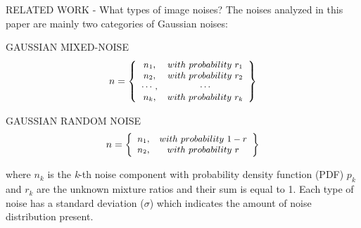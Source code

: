 \begin{frame}{RELATED WORK - What types of image noises?}
    The noises analyzed in this paper are mainly two categories of Gaussian 
    noises:
    \begin{minipage}{\linewidth}
        \centering
        \begin{minipage}{0.45\linewidth}
            \begin{block}{GAUSSIAN MIXED-NOISE}
                $$
                \small
                n = \left\{
                    \begin{array}{cc}
                        n_1, & with~probability~r_1\\
                        n_2, & with~probability~r_2\\
                        \cdots, & \cdots\\
                        n_k, & with~probability~r_k\\ 
                    \end{array}
                    \right\}
                $$
            \end{block}  
        \end{minipage}
        \hspace{0.05\linewidth}
        \begin{minipage}{0.47\linewidth}
            \begin{block}{GAUSSIAN RANDOM NOISE}
                $$
                \small
                n = \left\{
                    \begin{array}{cc}
                        n_1, & with~probability~1-r\\
                        n_2, & with~probability~r\\
                    \end{array}
                    \right\}
                $$
            \end{block} 
        \end{minipage}
    \end{minipage}
    where $ n_k $ is the \emph{k}-th noise component with probability density function (PDF) 
    $ p_k $ and $ r_k $ are the unknown mixture ratios and their sum is equal to 
    1. Each type of noise has a standard deviation ($\sigma$) which indicates the 
    amount of noise distribution present.     
\end{frame}

